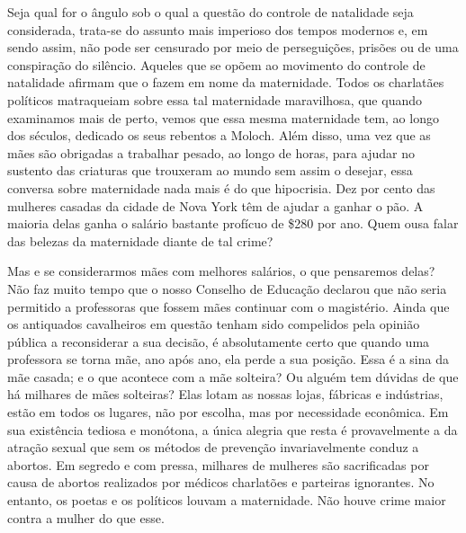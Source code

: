 Seja qual for o ângulo sob o qual a questão do controle de natalidade seja
considerada, trata-se do assunto mais imperioso dos tempos modernos e, em sendo
assim, não pode ser censurado por meio de perseguições, prisões ou de uma
conspiração do silêncio. Aqueles que se opõem ao movimento do controle
de natalidade afirmam que o fazem em nome da maternidade. Todos os
charlatães políticos matraqueiam sobre essa tal maternidade maravilhosa,
que quando examinamos mais de perto, vemos que essa mesma maternidade
tem, ao longo dos séculos, dedicado os seus rebentos a Moloch. Além
disso, uma vez que as mães são obrigadas a trabalhar pesado, ao longo de
horas, para ajudar no sustento das criaturas que trouxeram ao mundo sem
assim o desejar, essa conversa sobre maternidade nada mais é do que
hipocrisia. Dez por cento das mulheres casadas da cidade de Nova York
têm de ajudar a ganhar o pão. A maioria delas ganha o salário bastante
profícuo de \$280 por ano. Quem ousa falar das belezas da maternidade
diante de tal crime?

Mas e se considerarmos mães com melhores salários, o que pensaremos
delas? Não faz muito tempo que o nosso Conselho de Educação declarou que
não seria permitido a professoras que fossem mães continuar com o
magistério. Ainda que os antiquados cavalheiros em questão tenham sido
compelidos pela opinião pública a reconsiderar a sua decisão, é
absolutamente certo que quando uma professora se torna mãe, ano após
ano, ela perde a sua posição. Essa é a sina da mãe casada; e o que
acontece com a mãe solteira? Ou alguém tem dúvidas de que há milhares de
mães solteiras? Elas lotam as nossas lojas, fábricas e indústrias, estão
em todos os lugares, não por escolha, mas por necessidade econômica. Em
sua existência tediosa e monótona, a única alegria que resta é
provavelmente a da atração sexual que sem os métodos de prevenção
invariavelmente conduz a abortos. Em segredo e com pressa, milhares de
mulheres são sacrificadas por causa de abortos realizados por médicos
charlatões e parteiras ignorantes. No entanto, os poetas e os políticos
louvam a maternidade. Não houve crime maior contra a mulher do que esse.

